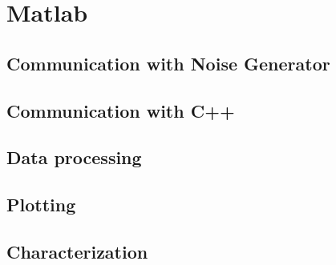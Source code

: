 \chapter{Matlab}

\section{Communication with Noise Generator}
\section{Communication with C++}
\section{Data processing}
\section{Plotting}
\section{Characterization}